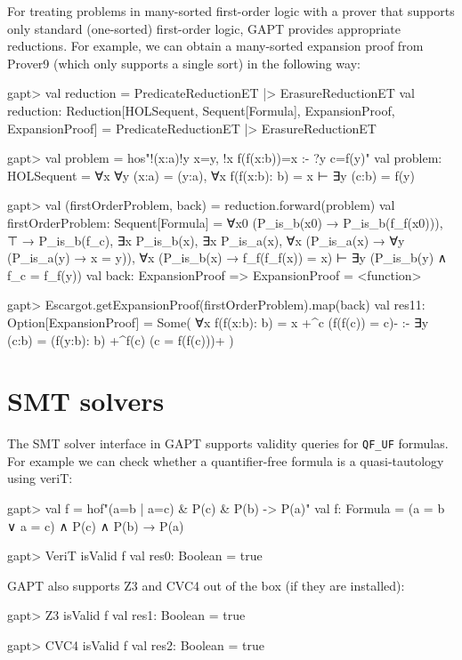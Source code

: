 \documentclass[a4paper,11pt]{book}
\begin{document}
For treating problems in many-sorted first-order logic with a prover that supports only
standard (one-sorted) first-order logic, GAPT provides appropriate reductions.
For example, we can obtain a many-sorted expansion proof from Prover9
(which only supports a single sort) in the following way:
\begin{clilisting}
gapt> val reduction = PredicateReductionET |> ErasureReductionET
val reduction:
  Reduction[HOLSequent, Sequent[Formula], ExpansionProof, ExpansionProof] = PredicateReductionET |> ErasureReductionET

gapt> val problem = hos"!(x:a)!y x=y, !x f(f(x:b))=x :- ?y c=f(y)"
val problem: HOLSequent = ∀x ∀y (x:a) = (y:a), ∀x f(f(x:b): b) = x ⊢ ∃y (c:b) = f(y)

gapt> val (firstOrderProblem, back) = reduction.forward(problem)
val firstOrderProblem: Sequent[Formula] = ∀x0 (P_is_b(x0) → P_is_b(f_f(x0))),
⊤ → P_is_b(f_c),
∃x P_is_b(x),
∃x P_is_a(x),
∀x (P_is_a(x) → ∀y (P_is_a(y) → x = y)),
∀x (P_is_b(x) → f_f(f_f(x)) = x)
⊢
∃y (P_is_b(y) ∧ f_c = f_f(y))
val back: ExpansionProof => ExpansionProof = <function>

gapt> Escargot.getExpansionProof(firstOrderProblem).map(back)
val res11: Option[ExpansionProof] = Some(
  ∀x f(f(x:b): b) = x +^{c} (f(f(c)) = c)-
:-
∃y (c:b) = (f(y:b): b) +^{f(c)} (c = f(f(c)))+
)

\end{clilisting}

\section{SMT solvers}

The SMT solver interface in GAPT supports validity queries for \verb,QF_UF,
formulas.  For example we can check whether a quantifier-free formula is a
quasi-tautology using veriT:
\begin{clilisting}
gapt> val f = hof"(a=b | a=c) & P(c) & P(b) -> P(a)"
val f: Formula = (a = b ∨ a = c) ∧ P(c) ∧ P(b) → P(a)

\end{clilisting}

\begin{clilisting}
gapt> VeriT isValid f
  val res0: Boolean = true

\end{clilisting}

GAPT also supports Z3 and CVC4 out of the box (if they are installed):
\begin{clilisting}
gapt> Z3 isValid f
  val res1: Boolean = true

gapt> CVC4 isValid f
  val res2: Boolean = true

\end{clilisting}
\end{document}
